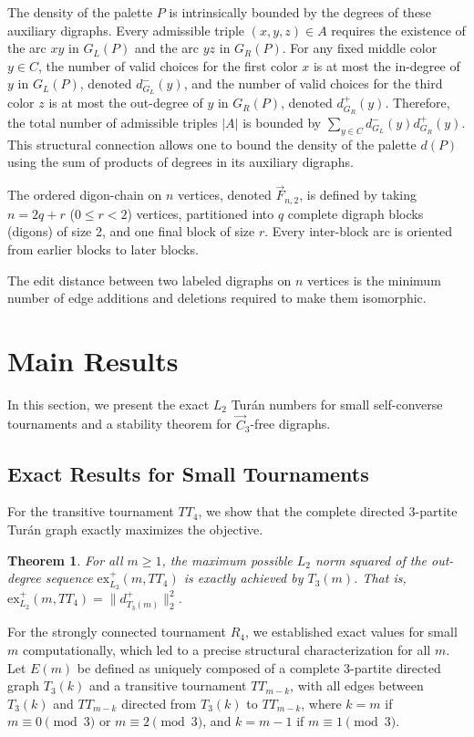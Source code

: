 \documentclass[a4paper]{amsart}
\newtheorem{theorem}{Theorem}[section]
\begin{document}
The density of the palette $P$ is intrinsically bounded by the degrees of these auxiliary digraphs.
Every admissible triple $(x, y, z) \in A$ requires the existence of the arc $xy$ in $G_L(P)$ and the arc $yz$ in $G_R(P)$.
For any fixed middle color $y \in C$, the number of valid choices for the first color $x$ is at most the in-degree of $y$ in $G_L(P)$, denoted $d^-_{G_L}(y)$, and the number of valid choices for the third color $z$ is at most the out-degree of $y$ in $G_R(P)$, denoted $d^+_{G_R}(y)$.
Therefore, the total number of admissible triples $|A|$ is bounded by $\sum_{y \in C} d^-_{G_L}(y) d^+_{G_R}(y)$.
This structural connection allows one to bound the density of the palette $d(P)$ using the sum of products of degrees in its auxiliary digraphs.

The ordered digon-chain on $n$ vertices, denoted $\vec{F}_{n,2}$, is defined by taking $n = 2q + r$ ($0 \le r < 2$) vertices, partitioned into $q$ complete digraph blocks (digons) of size 2, and one final block of size $r$.
Every inter-block arc is oriented from earlier blocks to later blocks.

The edit distance between two labeled digraphs on $n$ vertices is the minimum number of edge additions and deletions required to make them isomorphic.



\section{Main Results}

In this section, we present the exact $L_2$ Tur\'an numbers for small self-converse tournaments and a stability theorem for $\vec{C}_3$-free digraphs.

\subsection{Exact Results for Small Tournaments}

For the transitive tournament $TT_4$, we show that the complete directed 3-partite Tur\'an graph exactly maximizes the objective.

\begin{theorem}\label{thm:tt4}
For all $m \ge 1$, the maximum possible $L_2$ norm squared of the out-degree sequence $\text{ex}^+_{L_2}(m, TT_4)$ is exactly achieved by $T_3(m)$.
That is, $\text{ex}^+_{L_2}(m, TT_4) = \|d^+_{T_3(m)}\|_2^2$.
\end{theorem}

For the strongly connected tournament $R_4$, we established exact values for small $m$ computationally, which led to a precise structural characterization for all $m$.
Let $E(m)$ be defined as uniquely composed of a complete 3-partite directed graph $T_3(k)$ and a transitive tournament $TT_{m-k}$, with all edges between $T_3(k)$ and $TT_{m-k}$ directed from $T_3(k)$ to $TT_{m-k}$, where $k = m$ if $m \equiv 0 \pmod 3$ or $m \equiv 2 \pmod 3$, and $k = m - 1$ if $m \equiv 1 \pmod 3$.
\end{document}
